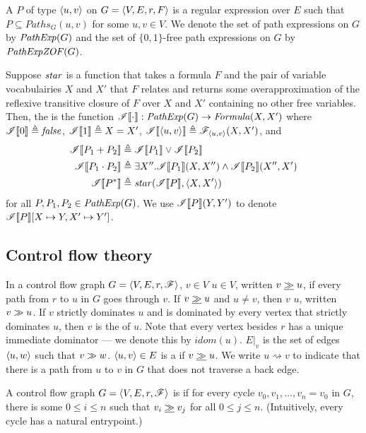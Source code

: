 A  $P$ of type $\langle u, v \rangle$ on
$G = \langle V, E, r, F \rangle$ is a regular expression over
$E$ such that $\si{P} \subseteq Paths_G(u,v)$ for some
$u,v \in V$. We denote the set of path expressions on $G$ by
$\mathit{PathExp}(G)$ and the set of $\{0,1\}$-free path expressions on
$G$ by $\mathit{PathExpZOF}(G)$.

Suppose $\mathit{star}$ is a function that takes a formula $F$ and the pair
of variable vocabulairies $X$ and $X'$ that $F$ relates and
returns some overapproximation of the reflexive transitive
closure of $F$ over $X$ and $X'$ containing no other free
variables. Then, the  is
the function $\mathscr{I} \llbracket \cdot \rrbracket: \mathit{PathExp}(G) \to \mathit{Formula}(X, X')$ where
$\mathscr{I} \llbracket 0 \rrbracket \triangleq \mathit{false}$, $\mathscr{I} \llbracket 1 \rrbracket \triangleq X = X'$,
$\mathscr{I} \llbracket \langle u, v \rangle \rrbracket \triangleq \mathscr{F}_{\langle u, v \rangle}(X, X')$, and
\begin{align*}
  \mathscr{I} \llbracket P_1 + P_2 \rrbracket &\triangleq \mathscr{I} \llbracket P_1 \rrbracket \lor \mathscr{I} \llbracket P_2 \rrbracket \\
  \mathscr{I} \llbracket P_1 \cdot P_2 \rrbracket &\triangleq \exists X''. \mathscr{I} \llbracket P_1 \rrbracket(X, X'')
                       \land \mathscr{I} \llbracket P_2 \rrbracket(X'', X') \\
  \mathscr{I} \llbracket P^* \rrbracket &\triangleq \mathit{star}(\mathscr{I} \llbracket P \rrbracket, \langle X, X' \rangle) 
\end{align*}
for all $P, P_1, P_2 \in \mathit{PathExp}(G)$. We use $\mathscr{I} \llbracket P \rrbracket(Y, Y')$ to
denote $\mathscr{I} \llbracket P \rrbracket[X \mapsto Y, X' \mapsto Y']$.

\subsection{Control flow theory}

In a control flow graph $G = \langle V, E, r, \mathscr{F} \rangle$,
$v\in V$  $u \in V$, written $v \mathrel{\underline{\mathrel{\gg}}} u$, if
every path from $r$ to $u$ in $G$ goes through $v$. If
$v \mathrel{\underline{\mathrel{\gg}}} u$ and $u \ne v$, then $v$  $u$, written $v \mathrel{\gg} u$. If $v$
strictly dominates $u$ and is dominated by every vertex that
strictly dominates $u$, then $v$ is the  of $u$. Note that every vertex besides $r$ has a
unique immediate dominator --- we denote this by
$idom(u)$. $E|_v$ is the set of edges $\langle u,w \rangle$ such that
$v \mathrel{\gg} w$. $\langle u, v \rangle \in E$ is a  if $v \mathrel{\underline{\mathrel{\gg}}} u$. We write $u \rightsquigarrow v$ to
indicate that there is a path from $u$ to $v$ in $G$ that does
not traverse a back edge.

A control flow graph $G = \langle V, E, r, \mathscr{F} \rangle$ is
 if for every cycle $v_0,v_1,\dots,v_n=v_0$ in
$G$, there is some $0 \le i \le n$ such that $v_i \mathrel{\underline{\mathrel{\gg}}} v_j$
for all $0 \le j \le n$. (Intuitively, every cycle has a natural
entrypoint.)

